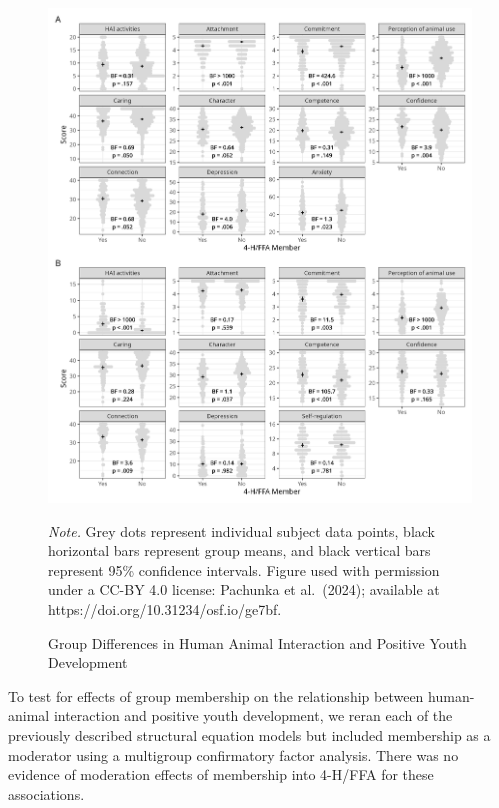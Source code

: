 \documentclass[
  jou,
  longtable,
  nolmodern,
  notxfonts,
  notimes,
  colorlinks=true,linkcolor=blue,citecolor=blue,urlcolor=blue]{apa7}
\begin{document}
\begin{figure}[!htbp]

{\caption{{Group Differences in Human Animal Interaction and Positive
Youth Development}{\label{fig-groupdiffs}}}}

\includegraphics[width=9in,height=\textheight,keepaspectratio]{figures/group_diff_measures.png}

{\noindent \emph{Note.} Grey dots represent individual subject data
points, black horizontal bars represent group means, and black vertical
bars represent 95\% confidence intervals. Figure used with permission
under a CC-BY 4.0 license: Pachunka et al.~(2024); available at
https://doi.org/10.31234/osf.io/ge7bf.}

\end{figure}

To test for effects of group membership on the relationship between
human-animal interaction and positive youth development, we reran each
of the previously described structural equation models but included
membership as a moderator using a multigroup confirmatory factor
analysis. There was no evidence of moderation effects of membership into
4-H/FFA for these associations.
\end{document}
